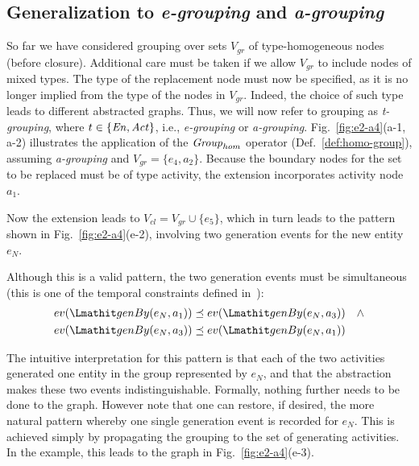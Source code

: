 \subsection{Generalization to \textit{e-grouping} and \textit{a-grouping}}
\label{sec:generalisation}

So far we have considered grouping over sets $V_{gr}$ of type-homogeneous nodes (before closure). Additional care must be taken if we allow $V_{gr}$ to include nodes of mixed types.  The type of the replacement node must now be specified, as it is no longer implied from the type of the nodes in $V_{gr}$. Indeed, the choice of such type leads to different abstracted graphs. Thus, we will now refer to grouping as \textit{t-grouping}, where $t \in \{ \mathit{En}, \mathit{Act}\}$, i.e., \textit{e-grouping} or \textit{a-grouping}. Fig.~\ref{fig:e2-a4}(a-1, a-2) illustrates the application of the $\mathit{Group}_{hom}$ operator (Def.~\ref{def:homo-group}), assuming \textit{a-grouping} and $V_{gr} = \{ e_4, a_2\}$. Because the boundary nodes for the set to be replaced must be of type activity, the extension incorporates activity node $a_1$.




   
%
Now the extension leads to $V_{cl} = V_{gr} \cup \{ e_5\}$, which in turn leads to the pattern shown in Fig.~\ref{fig:e2-a4}(e-2), involving two generation events for the new entity $e_{N}$.

Although this is a valid pattern, the two generation events must be simultaneous (this is one of the temporal constraints defined in~\citep{w3c-prov-constraints}):
\begin{align*}
ev(\wgby(e_N, a_1)) & \preorder ev(\wgby(e_N, a_3))  \quad \wedge \\
ev(\wgby(e_N, a_3)) & \preorder ev(\wgby(e_N, a_1))
\end{align*}

The intuitive interpretation for this pattern is that each of the two activities generated one entity in the group represented by $e_N$, and that the abstraction makes these two events indistinguishable. Formally, nothing further needs to be done to the graph.   However note that one can restore, if desired, the more natural pattern whereby one single generation event is recorded for $e_N$. This is achieved simply by propagating the grouping to the set of generating activities. In the example, this leads to the graph in Fig.~\ref{fig:e2-a4}(e-3).  



